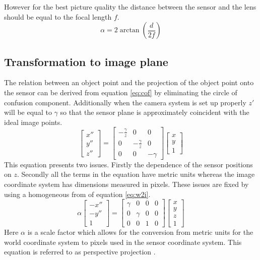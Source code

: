 However for the best picture quality the distance between the sensor and the lens should be equal to the focal length $f$.
\begin{equation}
	\alpha = 2 \arctan \left( \frac{d}{2f} \right)
\end{equation}

\subsection{Transformation to image plane}
The relation between an object point and the projection of the object point onto the sensor can be derived from equation \ref{eq:cof} by eliminating the circle of confusion component. Additionally when the camera system is set up properly $z'$ will be equal to $\gamma$ so that the sensor plane is approximately coincident with the ideal image points. 
\begin{equation}
\label{eq:w2i}
	\begin{bmatrix}
	x'' \\
	y'' \\
	z''
	\end{bmatrix} = 
	\begin{bmatrix}
	-\frac{\gamma}{z} & 0 & 0 \\
	0 & -\frac{\gamma}{z} & 0 \\
	0 & 0 & -\gamma
	\end{bmatrix}
	\begin{bmatrix}
	x \\
	y \\
	1
	\end{bmatrix}
\end{equation}
This equation presents two issues. Firstly the dependence of the sensor positions on $z$. Secondly all the terms in the equation have metric units whereas the image coordinate system has dimensions measured in pixels. These issues are fixed by using a homogeneous from of equation \ref{eq:w2i}.
\begin{equation}
\label{eq:w2ih}
	\alpha \begin{bmatrix}
	-x'' \\
	-y'' \\
	1
	\end{bmatrix} =
	\begin{bmatrix}
	\gamma & 0 & 0 & 0 \\
	0 & \gamma & 0 & 0 \\
	0 & 0 & 1 & 0
	\end{bmatrix}
	\begin{bmatrix}
	x \\
	y \\
	z \\
	1
	\end{bmatrix}
\end{equation}
Here $\alpha$ is a scale factor which allows for the conversion from metric units for the world coordinate system to pixels used in the sensor coordinate system. This equation is referred to as perspective projection \cite{sutton2009image}.

